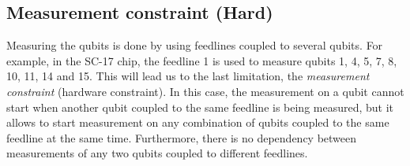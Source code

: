 










     



\subsection*{Measurement constraint (Hard)}
\label{sec:org58adcb1}

Measuring the qubits is done by using feedlines coupled to several qubits.
For example, in the SC-17 chip, the feedline 1 is used to measure qubits 1, 4, 5, 7, 8, 10, 11, 14 and 15. This will lead us to the last limitation, the \emph{measurement constraint} (hardware constraint). In this case, the measurement on a qubit cannot start when
another qubit coupled to the same feedline is being measured, but it
allows to start measurement on any combination of qubits coupled to
the same feedline at the same time.  Furthermore, there is no dependency between
measurements of any two qubits coupled to different feedlines.



